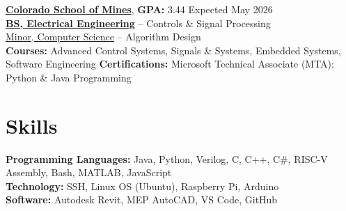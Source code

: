 \documentclass[11pt]{article}       %
\begin{document}
\textbf{\href{https://www.mines.edu/}{Colorado School of Mines}}, \textbf{GPA:} 3.44  \hfill Expected May 2026\\
\textbf{\href{https://electrical.mines.edu/undergraduate-program/}{BS, Electrical Engineering}} -- Controls \& Signal Processing  \\
\href{https://cs.mines.edu/csmines-minors-and-areas-of-special-interest/}{Minor, Computer Science} -- Algorithm Design\\
\textbf{Courses:} Advanced Control Systems, Signals \& Systems, Embedded Systems, Software Engineering
\textbf{Certifications:} Microsoft Technical Associate (MTA): Python \& Java Programming

\section*{Skills}
\vspace{5pt}

\textbf{Programming Languages:} Java, Python, Verilog, C, C++, C\#, RISC-V Assembly, Bash, MATLAB, JavaScript \\
\textbf{Technology:} SSH, Linux OS (Ubuntu), Raspberry Pi, Arduino \\
\textbf{Software:} Autodesk Revit, MEP AutoCAD, VS Code, GitHub \\
\end{document}
